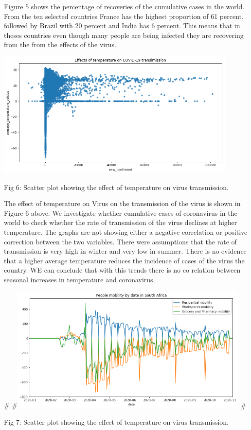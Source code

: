 \documentclass[12pt]{article}
\begin{document}
Figure 5 shows the percentage of recoveries of the cumulative cases in the world. From the ten selected countries France has the highest proportion of 61 percent, followed by Brazil with 20 percent and India has 6 percent. This means that in theses countries even though many people are being infected they are recovering from the from the effects of the virus.

\centering
\includegraphics[width=0.9\textwidth, inner]{scatter.png}
\caption{Fig 6: Scatter plot showing the effect of temperature on virus transmission.}

The effect of temperature on Virus on the transmission of the virus is shown in Figure 6 above.
We investigate whether cumulative  cases of coronavirus in the world to check whether the rate of transmission of the virus declines at higher temperature. The graphs are not showing either a negative correlation or positive correction between the two variables. There were assumptions that the rate of transmission is very high in winter and very low in summer. There is no evidence  that a higher average temperature reduces the incidence of cases of the virus the country. WE can conclude that with this trends there is no co relation between seasonal increases in temperature and coronavirus. 

#\centering
#\includegraphics[width=0.9\textwidth, inner]{mobility.png}
#\caption{Fig 7: Scatter plot showing the effect of temperature on virus transmission.}
\end{document}
